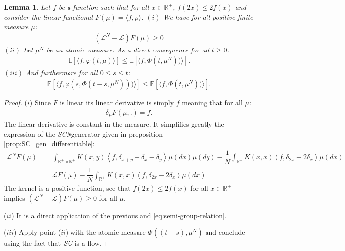 \documentclass[11pt,a4paper]{article}
\newcommand{\RR}{\mathbb{R}}
\newcommand{\LC}{\mathcal{L}}
\newcommand{\E}[1]{\mathbb{E}\left[#1\right]}
\newcommand{\SC}{{\emph{SC}}}
\newcommand{\SCN}{\emph{SCN}}
\newtheorem{lemma}[theorem]{Lemma}
\begin{document}
\begin{lemma}\label{lem:flow_linear_control}
    Let $f$ be a function such that for all $x \in \RR^+$, $f(2x)\leq 2f(x)$  and consider the linear functional $F(\mu) = \langle f,\mu \rangle$.
    $(i)$ We have for all positive finite measure $\mu$:
    \begin{align*}
        \left(\LC^N - \LC\right)F(\mu) \geq 0
    \end{align*}
    $(ii)$ Let $\mu^N$ be an atomic measure. As a direct consequence for all $t \geq 0$:
    \begin{align*}
        \E{\langle f,\varphi\left(t,\mu\right)\rangle} \leq \E{\langle f, \Phi(t,\mu^N))\rangle }.
    \end{align*}
    $(iii)$ And furthermore for all $0\leq s \leq t$:
    \begin{align*}
        \E{\langle f, \varphi(s,\Phi(t-s,\mu^N)))\rangle } \leq \E{\langle f, \Phi(t,\mu^N))\rangle }.
    \end{align*}
\end{lemma}
\begin{proof}
    ($i$) Since $F$ is linear its linear derivative is simply $f$ meaning that for all $\mu$:
    \begin{align*}
        \delta_\mu F(\mu,.) = f.
    \end{align*}
    The linear derivative is constant in the measure. It simplifies greatly the expression of the \SCN generator given in proposition \ref{prop:SC_gen_differentiable}: 
    \begin{align*}
        \LC^NF(\mu) &=  \int_{\RR^+ \times \RR^+} K(x,y)\left\langle  f,\delta_{x+y} - \delta_x - \delta_y\right\rangle\mu(dx)\mu(dy)
        -\dfrac{1}{N}\int_{\RR^+} K(x,x)\left\langle f,\delta_{2x} - 2\delta_x \right\rangle\mu(dx)\\
        &= \LC F(\mu) - \dfrac{1}{N}\int_{\RR^+} K(x,x)\left\langle f,\delta_{2x} - 2\delta_x \right\rangle\mu(dx)
    \end{align*}
    The kernel is a positive function, see that $f(2x)\leq 2f(x)$ for all $x \in \RR^+$ implies $\left(\LC^N - \LC\right)F(\mu) \geq 0$ for all $\mu$.
    
    ($ii$) It is a direct application of the previous and \eqref{eq:semi-group-relation}.
    
    ($iii$) Apply point ($ii$) with the atomic measure $\Phi\left((t-s),\mu^N\right)$ and conclude using the fact that $\SC$ is a flow.
\end{proof}


\end{document}
